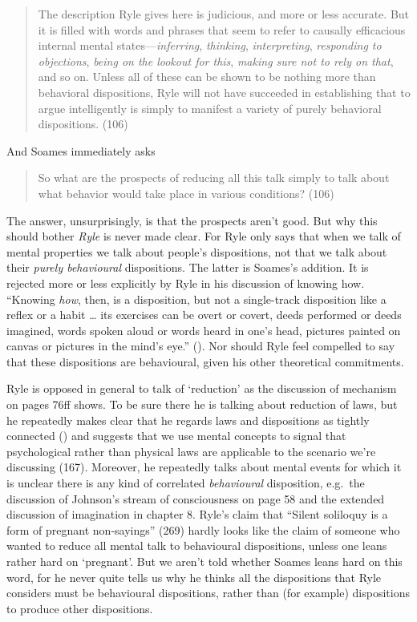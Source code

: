 \documentclass[
  11pt,
  letterpaper,
  DIV=11,
  numbers=noendperiod,
  twoside]{scrartcl}
\begin{document}
\begin{quote}
The description Ryle gives here is judicious, and more or less accurate.
But it is filled with words and phrases that seem to refer to causally
efficacious internal mental states---\emph{inferring}, \emph{thinking},
\emph{interpreting}, \emph{responding to objections}, \emph{being on the
lookout for this}, \emph{making sure not to rely on that}, and so on.
Unless all of these can be shown to be nothing more than behavioral
dispositions, Ryle will not have succeeded in establishing that to argue
intelligently is simply to manifest a variety of purely behavioral
dispositions. (106)
\end{quote}

And Soames immediately asks

\begin{quote}
So what are the prospects of reducing all this talk simply to talk about
what behavior would take place in various conditions? (106)
\end{quote}

The answer, unsurprisingly, is that the prospects aren't good. But why
this should bother \emph{Ryle} is never made clear. For Ryle only says
that when we talk of mental properties we talk about people's
dispositions, not that we talk about their \emph{purely behavioural}
dispositions. The latter is Soames's addition. It is rejected more or
less explicitly by Ryle in his discussion of knowing how. ``Knowing
\emph{how}, then, is a disposition, but not a single-track disposition
like a reflex or a habit \ldots{} its exercises can be overt or covert,
deeds performed or deeds imagined, words spoken aloud or words heard in
one's head, pictures painted on canvas or pictures in the mind's eye.''
(). Nor should Ryle feel compelled
to say that these dispositions are behavioural, given his other
theoretical commitments.

Ryle is opposed in general to talk of `reduction' as the discussion of
mechanism on pages 76ff shows. To be sure there he is talking about
reduction of laws, but he repeatedly makes clear that he regards laws
and dispositions as tightly connected () and suggests that we use mental concepts to signal that
psychological rather than physical laws are applicable to the scenario
we're discussing (167). Moreover, he repeatedly talks about mental
events for which it is unclear there is any kind of correlated
\emph{behavioural} disposition, e.g.~the discussion of Johnson's stream
of consciousness on page 58 and the extended discussion of imagination
in chapter 8. Ryle's claim that ``Silent soliloquy is a form of pregnant
non-sayings'' (269) hardly looks like the claim of someone who wanted to
reduce all mental talk to behavioural dispositions, unless one leans
rather hard on `pregnant'. But we aren't told whether Soames leans hard
on this word, for he never quite tells us why he thinks all the
dispositions that Ryle considers must be behavioural dispositions,
rather than (for example) dispositions to produce other dispositions.
\end{document}

